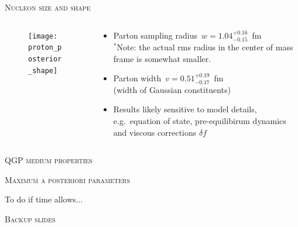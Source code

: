 \documentclass[aspectratio=169]{beamer}
\begin{document}
\begin{frame}{\scshape Nucleon size and shape}
  \begin{columns}
    \begin{column}{.45\textwidth}
      \begin{figure}
        \texttt{[image: proton\_posterior\_shape]}
      \end{figure}
    \end{column}
    \begin{column}{.55\textwidth}
      \begin{itemize}
        \item Parton sampling radius\, $w = 1.04_{-0.15}^{+0.16}$~fm\\[.5ex]
          $^*$Note: the actual rms radius in the center of mass frame is somewhat smaller.\\[2ex]
        \item Parton width\, $v = 0.51_{-0.17}^{+0.19}$~fm\\[.5ex]
          (width of Gaussian constituents)\\[2ex]
        \item Results likely sensitive to model details,
          e.g.\ equation of state, pre-equilibirum dynamics and viscous
          corrections $\delta f$\\[2ex]
      \end{itemize}
    \end{column}
  \end{columns}
\end{frame}

\begin{frame}{\scshape QGP medium properties}
\end{frame}

\begin{frame}{\scshape Maximum a posteriori parameters}
  \begin{center}
    \Large To do if time allows...
  \end{center}
\end{frame}

\appendix

\begin{frame}
  \begin{center}
    \Large \scshape Backup slides
  \end{center}
\end{frame}
\end{document}
